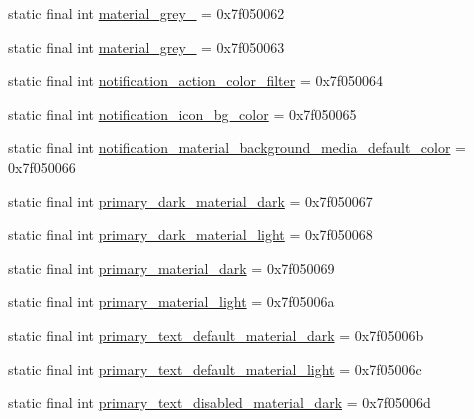 \begin{DoxyCompactItemize}
static final int \mbox{\hyperlink{classandroid_1_1support_1_1design_1_1R_1_1color_a6044c07d5de49682f79a05b1f984f84f}{material\+\_\+grey\+\_}} = 0x7f050062
\item 
static final int \mbox{\hyperlink{classandroid_1_1support_1_1design_1_1R_1_1color_af07ef2c90166a0345068e44048af4212}{material\+\_\+grey\+\_}} = 0x7f050063
\item 
static final int \mbox{\hyperlink{classandroid_1_1support_1_1design_1_1R_1_1color_a1d5ddbcb3f92a7298d4a30ab8f30f6c2}{notification\+\_\+action\+\_\+color\+\_\+filter}} = 0x7f050064
\item 
static final int \mbox{\hyperlink{classandroid_1_1support_1_1design_1_1R_1_1color_aecb2743a0e782ff961574645b5756456}{notification\+\_\+icon\+\_\+bg\+\_\+color}} = 0x7f050065
\item 
static final int \mbox{\hyperlink{classandroid_1_1support_1_1design_1_1R_1_1color_a59a06155e6267bf6d4d30698d58b58f8}{notification\+\_\+material\+\_\+background\+\_\+media\+\_\+default\+\_\+color}} = 0x7f050066
\item 
static final int \mbox{\hyperlink{classandroid_1_1support_1_1design_1_1R_1_1color_a7dc3cb3efd6d31479f735fe873f58748}{primary\+\_\+dark\+\_\+material\+\_\+dark}} = 0x7f050067
\item 
static final int \mbox{\hyperlink{classandroid_1_1support_1_1design_1_1R_1_1color_a25d5d8ccf48a63bdcd173ed25e84d186}{primary\+\_\+dark\+\_\+material\+\_\+light}} = 0x7f050068
\item 
static final int \mbox{\hyperlink{classandroid_1_1support_1_1design_1_1R_1_1color_a7af93f82b377f51a011497200729e857}{primary\+\_\+material\+\_\+dark}} = 0x7f050069
\item 
static final int \mbox{\hyperlink{classandroid_1_1support_1_1design_1_1R_1_1color_a20aa169940dc7ef70408191713f62b84}{primary\+\_\+material\+\_\+light}} = 0x7f05006a
\item 
static final int \mbox{\hyperlink{classandroid_1_1support_1_1design_1_1R_1_1color_aca4a2383fca5f6ccb557cfe94ebba6c0}{primary\+\_\+text\+\_\+default\+\_\+material\+\_\+dark}} = 0x7f05006b
\item 
static final int \mbox{\hyperlink{classandroid_1_1support_1_1design_1_1R_1_1color_a2d4f6d12973f5b51169658522eef0883}{primary\+\_\+text\+\_\+default\+\_\+material\+\_\+light}} = 0x7f05006c
\item 
static final int \mbox{\hyperlink{classandroid_1_1support_1_1design_1_1R_1_1color_a8a9d0f72c61f70a41ba77788e9736d8a}{primary\+\_\+text\+\_\+disabled\+\_\+material\+\_\+dark}} = 0x7f05006d

\end{DoxyCompactItemize}
